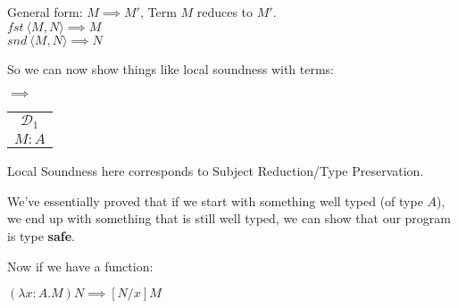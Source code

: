 \documentclass[12 pt]{article}
\begin{document}
    General form: $M \implies M'$, Term $M$ reduces to $M'$.
    \\ $fst\ \langle M, N \rangle \implies M$
    \\ $snd\ \langle M, N \rangle \implies N$

    So we can now show things like local soundness with terms:
    \begin{center}
      \noLine
      \noLine
      \DP
      $\implies$
      \begin{tabular}{c}
        $\mathcal{D}_1$
        \\ $M : A$
      \end{tabular}
    \end{center}
    Local Soundness here corresponds to Subject Reduction/Type
    Preservation.

    We've essentially proved that if we start with something well
    typed (of type $A$), we end up with something that is still well
    typed, we can show that our program is type \textbf{safe}.

    Now if we have a function:

    $(\lambda x : A . M) N \implies [N/x] M$
\end{document}
